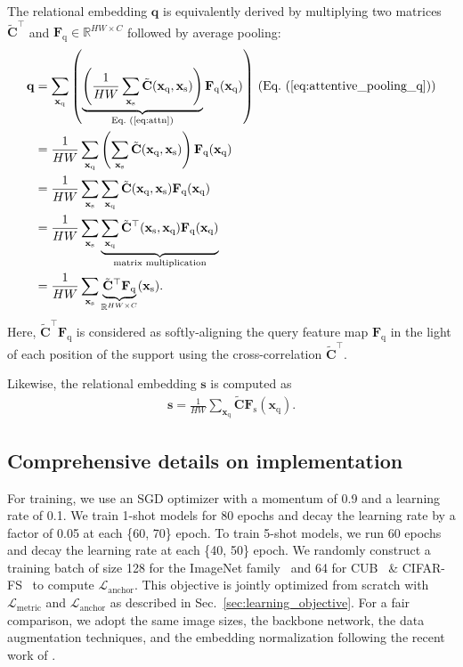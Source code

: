 \documentclass[10pt,twocolumn,letterpaper]{article}
\newcommand{\Real}{\mathbb{R}}
\newcommand{\bs}{\mathbf{s}}
\newcommand{\bC}{\mathbf{C}}
\newcommand{\bq}{\mathbf{q}}
\newcommand{\bF}{\mathbf{F}}
\newcommand{\bx}{\mathbf{x}}
\newcommand{\texts}{{\text{s}}}
\newcommand{\textq}{{\text{q}}}
\begin{document}
The relational embedding $\bq$ is equivalently derived by multiplying two matrices $\tilde{\bC}^{\top}$ and $\bF_\textq \in \Real^{HW \times C}$ followed by average pooling:
\begin{align}
\nonumber
\bq &= \sum_{\bx_\textq} \left( \underbrace{\left( \frac{1}{HW} \sum_{\bx_\texts} \tilde{\bC}(\bx_\textq, \bx_\texts) \right)}_{\text{Eq.~(\ref{eq:attn})}} \bF_\textq(\bx_\textq) \right) \, (\text{Eq.~(\ref{eq:attentive_pooling_q})}) \\
\nonumber
    &= \frac{1}{HW} \sum_{\bx_\textq} \left( \sum_{\bx_\texts} \tilde{\bC}(\bx_\textq, \bx_\texts) \right) \bF_\textq(\bx_\textq) \\
\nonumber
    &= \frac{1}{HW} \sum_{\bx_\texts} \sum_{\bx_\textq}  \tilde{\bC}(\bx_\textq, \bx_\texts) \bF_\textq(\bx_\textq) \\
\nonumber
    &= \frac{1}{HW} \sum_{\bx_\texts} \underbrace{\sum_{\bx_\textq}  \tilde{\bC}^{\top}(\bx_\texts, \bx_\textq) \bF_\textq(\bx_\textq)}_{\text{matrix multiplication}} \\
    &= \frac{1}{HW} \sum_{\bx_\texts} \underbrace{\tilde{\bC}^{\top}\bF_\textq}_{\Real^{HW \times C}} (\bx_\texts).
\end{align}
Here, $\tilde{\bC}^{\top}\bF_\textq$ is considered as softly-aligning the query feature map $\bF_\textq$ in the light of each position of the support using the cross-correlation $\tilde{\bC}^{\top}$.

Likewise, the relational embedding $\bs$ is computed as 
\begin{eqnarray}
\bs = \frac{1}{HW} \sum_{\bx_\textq} \tilde{\bC}\bF_\texts(\bx_\textq).
\end{eqnarray}








\subsection{Comprehensive details on implementation}
For training, we use an SGD optimizer with a momentum of 0.9 and a learning rate of 0.1.
We train 1-shot models for 80 epochs and decay the learning rate by a factor of 0.05 at each \{60, 70\} epoch.
To train 5-shot models, we run 60 epochs and decay the learning rate at each \{40, 50\} epoch.
We randomly construct a training batch of size 128 for the ImageNet family~\cite{matchingnet, tieredimagenet} and 64 for CUB~\cite{cub} \& CIFAR-FS~\cite{cifarfs} to compute $\mathcal{L}_{\text{anchor}}$.
This objective is jointly optimized from scratch with $\mathcal{L}_{\text{metric}}$ and $\mathcal{L}_{\text{anchor}}$ as described in Sec.~\ref{sec:learning_objective}.
For a fair comparison, we adopt the same image sizes, the backbone network, the data augmentation techniques, and the embedding normalization following the recent work of \cite{deepemd, feat}.
\end{document}
